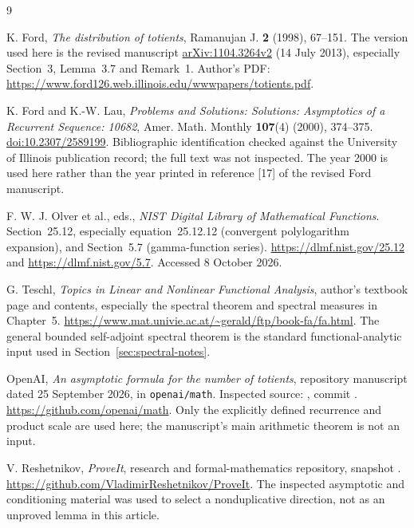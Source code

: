 \begin{thebibliography}{9}

K. Ford, \emph{The distribution of totients},
Ramanujan J. \textbf{2} (1998), 67--151.
The version used here is the revised manuscript
\href{https://arxiv.org/abs/1104.3264v2}{arXiv:1104.3264v2}
(14 July 2013), especially Section~3, Lemma~3.7 and Remark~1.
Author's PDF:
\url{https://www.ford126.web.illinois.edu/wwwpapers/totients.pdf}.

K. Ford and K.-W. Lau, \emph{Problems and Solutions: Solutions:
Asymptotics of a Recurrent Sequence: 10682},
Amer. Math. Monthly \textbf{107}(4) (2000), 374--375.
\href{https://doi.org/10.2307/2589199}{doi:10.2307/2589199}.
Bibliographic identification checked against the University of Illinois
publication record; the full text was not inspected. The year 2000
is used here rather than the year printed in reference [17] of
the revised Ford manuscript.

F. W. J. Olver et al., eds., \emph{NIST Digital Library of Mathematical
Functions}. Section~25.12, especially equation~25.12.12 (convergent
polylogarithm expansion), and Section~5.7 (gamma-function series).
\url{https://dlmf.nist.gov/25.12} and
\url{https://dlmf.nist.gov/5.7}. Accessed 8 October 2026.

G. Teschl, \emph{Topics in Linear and Nonlinear Functional Analysis},
author's textbook page and contents, especially the spectral theorem
and spectral measures in Chapter~5.
\url{https://www.mat.univie.ac.at/~gerald/ftp/book-fa/fa.html}.
The general bounded self-adjoint spectral theorem is the standard
functional-analytic input used in Section~\ref{sec:spectral-notes}.

OpenAI, \emph{An asymptotic formula for the number of totients},
repository manuscript dated 25 September 2026, in \texttt{openai/math}.
Inspected source:
,
commit .
\url{https://github.com/openai/math}.
Only the explicitly defined recurrence and product scale are used here;
the manuscript's main arithmetic theorem is not an input.

V. Reshetnikov, \emph{ProveIt}, research and formal-mathematics repository,
snapshot .
\url{https://github.com/VladimirReshetnikov/ProveIt}.
The inspected asymptotic and conditioning material was used to select
a nonduplicative direction, not as an unproved lemma in this article.

\end{thebibliography}
